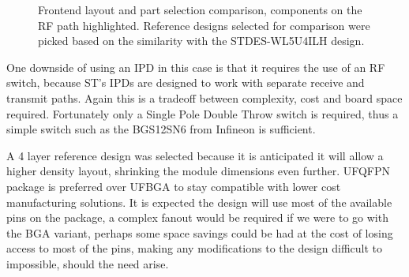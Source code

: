 \begin{figure}
    \centering
     \hfill
    \hfill
    \caption{\label{fig:frontend-comparison} Frontend layout and part selection comparison, components on the RF path highlighted. Reference designs selected for comparison were picked based on the similarity with the STDES-WL5U4ILH design.}
\end{figure}

One downside of using an IPD in this case is that it requires the use of an RF switch, because ST's IPDs are designed to work with separate receive and transmit paths. Again this is a tradeoff between complexity, cost and board space required. Fortunately only a Single Pole Double Throw switch is required, thus a simple switch such as the BGS12SN6 from Infineon is sufficient.

A 4 layer reference design was selected because it is anticipated it will allow a higher density layout, shrinking the module dimensions even further. UFQFPN package is preferred over UFBGA to stay compatible with lower cost manufacturing solutions. It is expected the design will use most of the available pins on the package, a complex fanout would be required if we were to go with the BGA variant, perhaps some space savings could be had at the cost of losing access to most of the pins, making any modifications to the design difficult to impossible, should the need arise.

